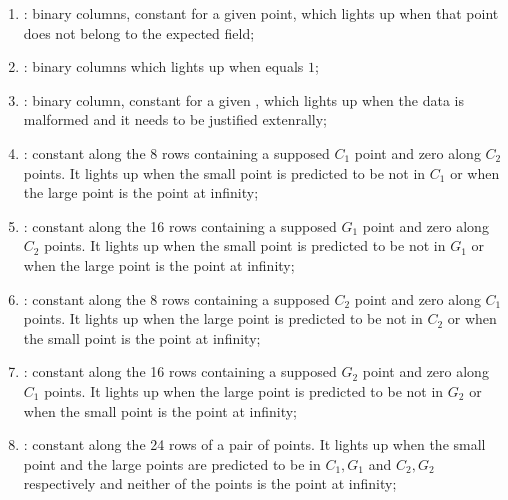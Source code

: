 \begin{enumerate}[resume]
      \item \both{\malformedDataBit} \blsPrediction{}: binary columns, constant for a given point, which lights up when that point does not belong to the expected field; %
      \item \both{\malformedDataAcc}: binary columns which lights up when \malformedDataBit{} equals $1$;              
      \item \both{\malformedDataExternalJustification}: binary column, constant for a given \blsId, which lights up when the data is malformed and it needs to be justified extenrally;
      
      \item \both{\cOneMembershipTestRequired}:
            constant along the 8 rows containing a supposed $C_1$ point and zero along $C_2$ points. It lights up when the small point is predicted to be not in $C_1$ or when the large point is the point at infinity; 
      \item \both{\gOneMembershipTestRequired}:
            constant along the 16 rows containing a supposed $G_1$ point and zero along $C_2$ points. It lights up when the small point is predicted to be not in $G_1$ or when the large point is the point at infinity; 
      \item \both{\cTwoMembershipTestRequired}:
            constant along the 8 rows containing a supposed $C_2$ point and zero along $C_1$ points. It lights up when the large point is predicted to be not in $C_2$ or when the small point is the point at infinity;
      \item \both{\gTwoMembershipTestRequired}:
            constant along the 16 rows containing a supposed $G_2$ point and zero along $C_1$ points. It lights up when the large point is predicted to be not in $G_2$ or when the small point is the point at infinity;
      \item \both{\acceptablePairOfPoints}: constant along the 24 rows of a pair of points. It lights up when the small point and the large points are predicted to be in $C_1,G_1$ and $C_2,G_2$ respectively and neither of the points is the point at infinity;
\end{enumerate}
     

